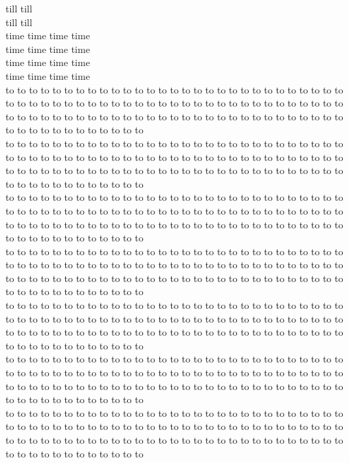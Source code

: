 till till\\
till till\\
time time time time\\
time time time time\\
time time time time\\
time time time time\\
to to to to to to to to to to to to to to to to to to to to to to to to to to to to to to to to to to to to to to to to to to to to to to to to to to to to to to to to to to to to to to to to to to to to to to to to to to to to to to to to to to to to to to to to to to to to to to to to to to to\\
to to to to to to to to to to to to to to to to to to to to to to to to to to to to to to to to to to to to to to to to to to to to to to to to to to to to to to to to to to to to to to to to to to to to to to to to to to to to to to to to to to to to to to to to to to to to to to to to to to to\\
to to to to to to to to to to to to to to to to to to to to to to to to to to to to to to to to to to to to to to to to to to to to to to to to to to to to to to to to to to to to to to to to to to to to to to to to to to to to to to to to to to to to to to to to to to to to to to to to to to to\\
to to to to to to to to to to to to to to to to to to to to to to to to to to to to to to to to to to to to to to to to to to to to to to to to to to to to to to to to to to to to to to to to to to to to to to to to to to to to to to to to to to to to to to to to to to to to to to to to to to to\\
to to to to to to to to to to to to to to to to to to to to to to to to to to to to to to to to to to to to to to to to to to to to to to to to to to to to to to to to to to to to to to to to to to to to to to to to to to to to to to to to to to to to to to to to to to to to to to to to to to to\\
to to to to to to to to to to to to to to to to to to to to to to to to to to to to to to to to to to to to to to to to to to to to to to to to to to to to to to to to to to to to to to to to to to to to to to to to to to to to to to to to to to to to to to to to to to to to to to to to to to to\\
to to to to to to to to to to to to to to to to to to to to to to to to to to to to to to to to to to to to to to to to to to to to to to to to to to to to to to to to to to to to to to to to to to to to to to to to to to to to to to to to to to to to to to to to to to to to to to to to to to to\\
